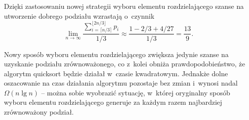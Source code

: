 Dzięki zastosowaniu nowej strategii wyboru elementu rozdzielającego szanse na utworzenie dobrego podziału wzrastają o~czynnik
\[
	\lim_{n\to\infty}\frac{\sum_{i=\lceil n/3\rceil}^{\lfloor 2n/3\rfloor}p_i}{1/3} \approx \frac{1-2/3+4/27}{1/3} = \frac{13}{9}.
\]

\subproblem %
Nowy sposób wyboru elementu rozdzielającego zwiększa jedynie szanse na uzyskanie podziału zrównoważonego, co z~kolei obniża prawdopodobieństwo, że algorytm quicksort będzie działał w~czasie kwadratowym.
Jednakże dolne oszacowanie na czas działania algorytmu pozostaje bez zmian i~wynosi nadal $\Omega(n\lg n)$ -- można sobie wyobrazić sytuację, w~której oryginalny sposób wyboru elementu rozdzielającego generuje za każdym razem najbardziej zrównoważony podział.
